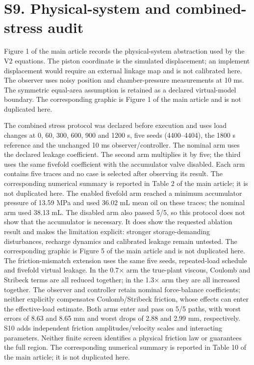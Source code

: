 \documentclass[11pt,a4paper]{article}
\begin{document}
\section*{S9. Physical-system and combined-stress audit}
Figure 1 of the main article records the physical-system abstraction used by the V2 equations. The piston coordinate is the simulated displacement; an implement displacement would require an external linkage map and is not calibrated here. The observer uses noisy position and chamber-pressure measurements at 10 ms. The symmetric equal-area assumption is retained as a declared virtual-model boundary.
The corresponding graphic is Figure 1 of the main article and is not duplicated here.

The combined stress protocol was declared before execution and uses load changes at 0, 60, 300, 600, 900 and 1200 s, five seeds (4400--4404), the 1800 s reference and the unchanged 10 ms observer/controller. The nominal arm uses the declared leakage coefficient. The second arm multiplies it by five; the third uses the same fivefold coefficient with the accumulator valve disabled. Each arm contains five traces and no case is selected after observing its result.
The corresponding numerical summary is reported in Table 2 of the main article; it is not duplicated here.
The enabled fivefold arm reached a minimum accumulator pressure of 13.59 MPa and used 36.02 mL mean oil on these traces; the nominal arm used 38.13 mL. The disabled arm also passed 5/5, so this protocol does not show that the accumulator is necessary. It does show the requested ablation result and makes the limitation explicit: stronger storage-demanding disturbances, recharge dynamics and calibrated leakage remain untested.
The corresponding graphic is Figure 5 of the main article and is not duplicated here.
The friction-mismatch extension uses the same five seeds, repeated-load schedule and fivefold virtual leakage. In the 0.7$\times$ arm the true-plant viscous, Coulomb and Stribeck terms are all reduced together; in the 1.3$\times$ arm they are all increased together. The observer and controller retain nominal force-balance coefficients; neither explicitly compensates Coulomb/Stribeck friction, whose effects can enter the effective-load estimate. Both arms enter and pass on 5/5 paths, with worst errors of 8.63 and 8.65 mm and worst drops of 2.88 and 2.99 mm, respectively. S10 adds independent friction amplitudes/velocity scales and interacting parameters. Neither finite screen identifies a physical friction law or guarantees the full region.
The corresponding numerical summary is reported in Table 10 of the main article; it is not duplicated here.
\end{document}
